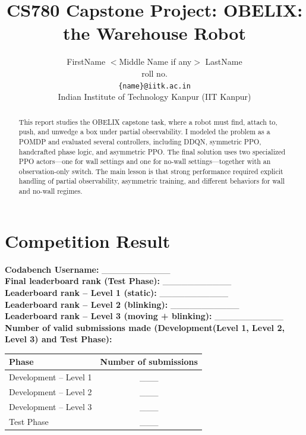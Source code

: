 \documentclass[11pt, oneside]{article}   	%
\title{CS780 Capstone Project: 
OBELIX: the Warehouse Robot
}
\author{
    FirstName $<$Middle Name if any$>$ LastName  \\ 
    roll no.\\
   {\tt \{name\}@iitk.ac.in}\\
{Indian Institute of Technology Kanpur (IIT Kanpur)}
}
\date{}							%
\begin{document}
\maketitle

\begin{abstract}
This report studies the OBELIX capstone task, where a robot must find, attach to, push, and unwedge a box under partial observability. I modeled the problem as a POMDP and evaluated several controllers, including DDQN, symmetric PPO, handcrafted phase logic, and asymmetric PPO. The final solution uses two specialized PPO actors---one for wall settings and one for no-wall settings---together with an observation-only switch. The main lesson is that strong performance required explicit handling of partial observability, asymmetric training, and different behaviors for wall and no-wall regimes.
\end{abstract}

\section{Competition Result}
\textbf{Codabench Username:} \_\_\_\_\_\_\_\_\_\_\_ \\
\textbf{Final leaderboard rank (Test Phase):} \_\_\_\_\_\_\_\_\_\_\_ \\
\textbf{Leaderboard rank -- Level 1 (static):} \_\_\_\_\_\_\_\_\_\_\_ \\
\textbf{Leaderboard rank -- Level 2 (blinking):} \_\_\_\_\_\_\_\_\_\_\_ \\
\textbf{Leaderboard rank -- Level 3 (moving + blinking):} \_\_\_\_\_\_\_\_\_\_\_ \\

\vspace{0.3cm}
\textbf{Number of valid submissions made (Development(Level 1, Level 2, Level 3) and Test Phase):}

\begin{table}[H]
\centering
\begin{tabular}{lc}
\toprule
Phase & Number of submissions \\
\midrule
Development -- Level 1 & \_\_\_ \\
Development -- Level 2 & \_\_\_ \\
Development -- Level 3 & \_\_\_ \\
Test Phase & \_\_\_ \\
\bottomrule
\end{tabular}
\end{table}
\end{document}
